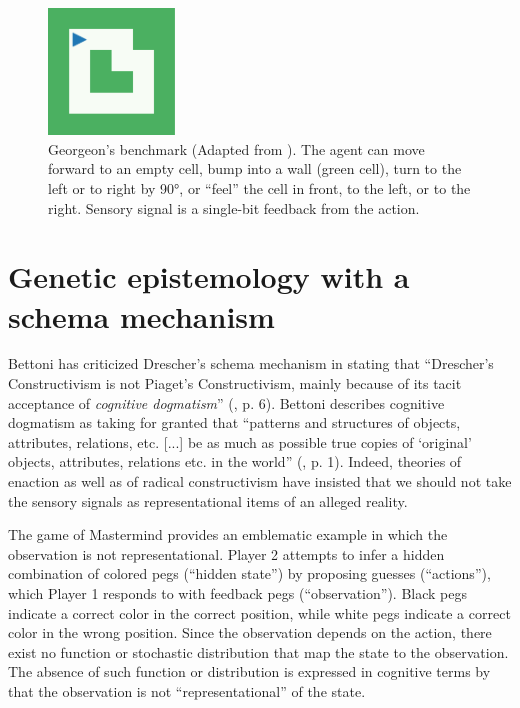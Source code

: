 \documentclass[runningheads]{llncs}
\begin{document}
\begin{figure}
	\centering
	\includegraphics[width=0.3\textwidth]{Figure_grid_plot.pdf}
	\caption{Georgeon's benchmark (Adapted from \cite{georgeon_intrinsically-motivated_2012}).
	The agent can move forward to an empty cell, bump into a wall (green cell), turn to the left or to right by 90°, or ``feel'' the cell in front, to the left, or to the right. 
	Sensory signal is a single-bit feedback from the action. 	
} 
	\label{fig:georgeon}
\end{figure}


\section{Genetic epistemology with a schema mechanism}

Bettoni  has criticized Drescher's schema mechanism in stating that ``Drescher's Constructivism is not Piaget's Constructivism, mainly because of its tacit acceptance of \textit{cognitive dogmatism}'' (\cite{bettoni_made-up_1993}, p. 6).
Bettoni describes cognitive dogmatism as taking for granted that ``patterns and structures of objects, attributes, relations, etc. [...] be as much as possible true copies of `original' objects, attributes, relations etc. in the world'' (\cite{bettoni_made-up_1993}, p. 1).
Indeed, theories of enaction as well as of radical constructivism have insisted that we should not take the sensory signals as representational items of an alleged reality. 


The game of Mastermind provides an emblematic example in which the observation is not representational. 
Player 2 attempts to infer a hidden combination of colored pegs (``hidden state'') by proposing guesses (``actions''), which Player 1 responds to with feedback pegs (``observation''). Black pegs indicate a correct color in the correct position, while white pegs indicate a correct color in the wrong position.
Since the observation depends on the action, there exist no function or stochastic distribution that map the state to the observation. 
The absence of such function or distribution is expressed in cognitive terms by that the observation is not ``representational'' of the state.
\end{document}
